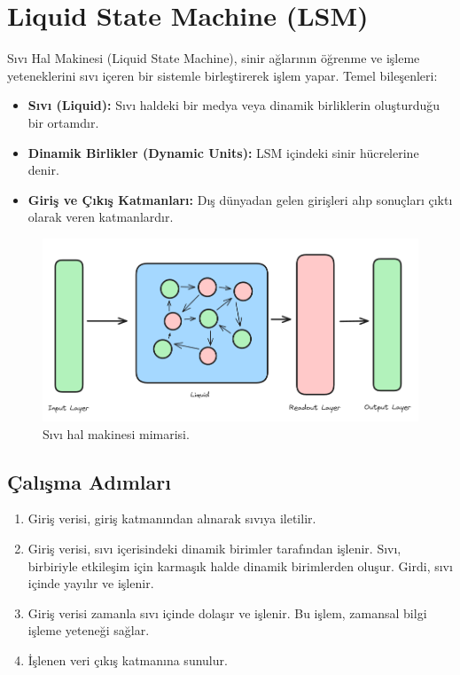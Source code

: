\section{Liquid State Machine (LSM)}
Sıvı Hal Makinesi (Liquid State Machine), sinir ağlarının öğrenme ve işleme yeteneklerini sıvı içeren bir sistemle birleştirerek işlem yapar. Temel bileşenleri:
\begin{itemize} 
    \item \textbf{Sıvı (Liquid):} Sıvı haldeki bir medya veya dinamik birliklerin oluşturduğu bir ortamdır.
    \item \textbf{Dinamik Birlikler (Dynamic Units):} LSM içindeki sinir hücrelerine denir. 
    \item \textbf{Giriş ve Çıkış Katmanları:} Dış dünyadan gelen girişleri alıp sonuçları çıktı olarak veren katmanlardır.
\end{itemize}

\begin{figure}[h]
    \centering
    \includegraphics[width=1\textwidth]{images/liquid_state_machines.png}
    \caption{Sıvı hal makinesi mimarisi.}
    \label{fig:enter-label}
\end{figure}

\subsection{Çalışma Adımları}
\begin{enumerate}
    \item Giriş verisi, giriş katmanından alınarak sıvıya iletilir.
    \item Giriş verisi, sıvı içerisindeki dinamik birimler tarafından işlenir. Sıvı, birbiriyle etkileşim için karmaşık halde dinamik birimlerden oluşur. Girdi, sıvı içinde yayılır ve işlenir.
    \item Giriş verisi zamanla sıvı içinde dolaşır ve işlenir. Bu işlem, zamansal bilgi işleme yeteneği sağlar.
    \item İşlenen veri çıkış katmanına sunulur.
\end{enumerate}

\newpage